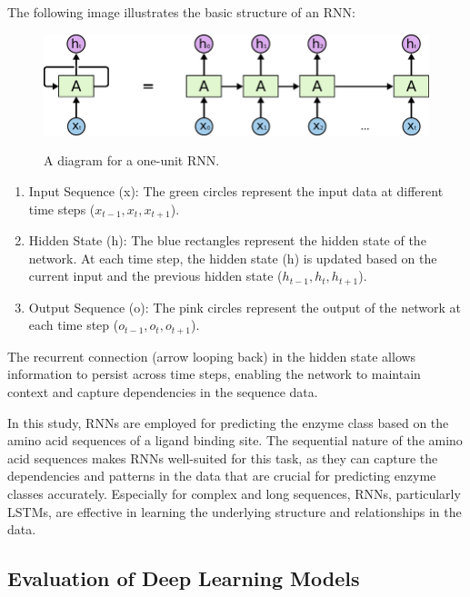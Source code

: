 The following image illustrates the basic structure of an RNN:

\begin{figure}[hbt]
    \centering
    \begin{minipage}[t]{\textwidth}
    \caption{A diagram for a one-unit RNN.}
    \includegraphics[width=1\textwidth]{img/Recurrent Neural Network Unfold.png}\\
    \label{fig:recurrent-neural-network}
    \end{minipage}
\end{figure}

\begin{enumerate}
    \item Input Sequence (x): The green circles represent the input data at different time steps ($ x_{t-1}, x_{t}, x_{t+1} $).
    \item Hidden State (h): The blue rectangles represent the hidden state of the network. At each time step, the hidden state (h) is updated based on the current input and the previous hidden state ($h_{t-1}, h_{t}, h_{t+1}$).
    \item Output Sequence (o): The pink circles represent the output of the network at each time step ($o_{t-1}, o_{t}, o_{t+1}$).
\end{enumerate}

The recurrent connection (arrow looping back) in the hidden state allows information to persist across time steps, enabling the network to maintain context and capture dependencies in the sequence data.

In this study, RNNs are employed for predicting the enzyme class based on the amino acid sequences of a ligand binding site. The sequential nature of the amino acid sequences makes RNNs well-suited for this task, as they can capture the dependencies and patterns in the data that are crucial for predicting enzyme classes accurately. Especially for complex and long sequences, RNNs, particularly LSTMs, are effective in learning the underlying structure and relationships in the data.

\subsection{Evaluation of Deep Learning Models}
\label{sec:Evaluation of Deep Learning Models}

